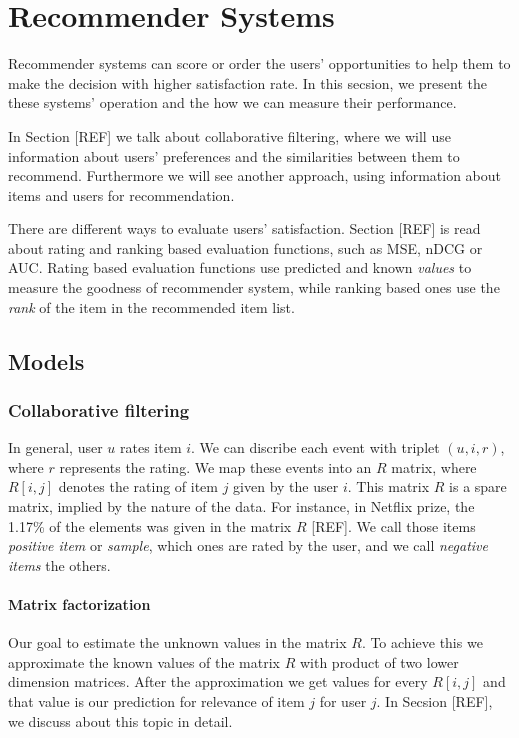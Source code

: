 
\chapter{Recommender Systems}
Recommender systems can score or order the users' opportunities to help them to
make the decision with higher satisfaction rate. In this secsion, we present the
these systems' operation and the how we can measure their performance.

In Section [REF] we talk about collaborative filtering, where we will use
information about users' preferences and the similarities between them to
recommend. Furthermore we will see another approach, using information about
items and users for recommendation.

There are different ways to evaluate users' satisfaction. Section [REF] is read
about rating and ranking based evaluation functions, such as MSE, nDCG or AUC.
Rating based evaluation functions use predicted and known \emph{values} to
measure the goodness of  recommender system, while ranking based ones use the
\emph{rank} of the item in  the recommended item list.

\section{Models}
\subsection{Collaborative filtering}
In general, user $u$ rates item $i$. We can discribe each event with triplet
$(u, i, r)$, where $r$ represents the rating. We map these events into an $R$
matrix, where $R[i,j]$ denotes the rating of item $j$ given by the user $i$. This
matrix $R$ is a spare matrix, implied by the nature of the data. For instance,
in Netflix prize, the 1.17\% of the elements was given in the matrix $R$ [REF]. We
call those items \emph{positive item} or \emph{sample}, which ones are rated by
the user, and we call \emph{negative items} the others.

\subsubsection{Matrix factorization}
Our goal to estimate the unknown values in the matrix $R$. To achieve this we
approximate the known values of the matrix $R$ with product of two lower dimension
matrices. After the approximation we get values for every $R[i,j]$ and that value
is our prediction for relevance of item $j$ for user $j$. In Secsion [REF], we
discuss about this topic in detail.
 
